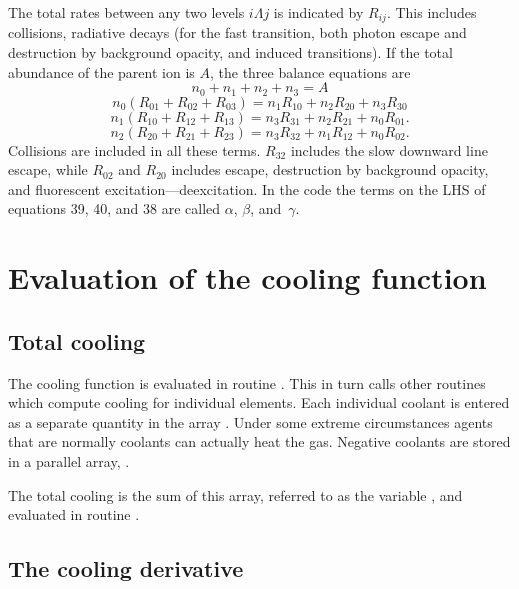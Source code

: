 The total rates between any two levels $i\Lambda j$
is indicated by $R_{ij}$.  This
includes collisions, radiative decays (for the fast transition, both photon
escape and destruction by background opacity, and induced transitions).
If the total abundance of the parent ion is $A$, the three balance equations
are
\begin{equation}
{n_0} + {n_1} + {n_2} + {n_3} = A
\end{equation}
\begin{equation}
{n_0}\left( {{R_{01}} + {R_{02}} + {R_{03}}} \right) = {n_1}{R_{10}} +
{n_2}{R_{20}} + {n_3}{R_{30}}
\end{equation}
\begin{equation}
{n_1}\left( {{R_{10}} + {R_{12}} + {R_{13}}} \right) = {n_3}{R_{31}} +
{n_2}{R_{21}} + {n_0}{R_{01}}.
\end{equation}
\begin{equation}
{n_2}\left( {{R_{20}} + {R_{21}} + {R_{23}}} \right) = {n_3}{R_{32}} +
{n_1}{R_{12}} + {n_0}{R_{02}} .
\end{equation}
Collisions are included in all these terms.  $R_{32}$ includes the slow downward
line escape, while $R_{02}$ and $R_{20}$ includes escape, destruction by background
opacity, and fluorescent excitation---deexcitation.  In the code the terms
on the LHS of equations 39, 40, and 38 are called $\alpha$, $\beta$,
and~$\gamma$.

\section{Evaluation of the cooling function}

\subsection{Total cooling}

The cooling function is evaluated in routine .  This in turn calls
other routines which compute cooling for individual elements.  Each
individual coolant is entered as a separate quantity in the array
.
Under some extreme circumstances agents that are normally coolants can
actually heat the gas.  Negative coolants are stored in a parallel array,
.

The total cooling is the sum of this array, referred to as the variable
, and evaluated in routine .

\subsection{The cooling derivative}

